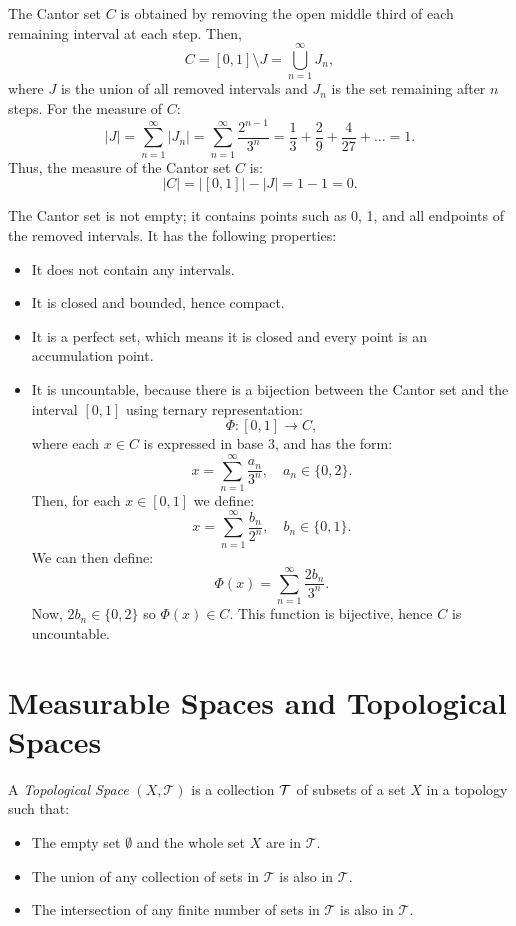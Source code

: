 \documentclass[11pt]{article}
\newcommand{\card}[1]{\lvert #1 \rvert}
\begin{document}
The Cantor set \(C\) is obtained by removing the open middle third of each remaining interval at each step. Then,
\[C = [0, 1] \setminus J = \bigcup_{n=1}^{\infty} J_n,\]
where \(J\) is the union of all removed intervals and \(J_n\) is the set remaining after \(n\) steps. For the measure of \(C\):
\[\card{J} = \sum_{n=1}^{\infty} \card{J_n} = \sum_{n=1}^{\infty} \frac{2^{n-1}}{3^n} = \frac{1}{3} + \frac{2}{9} + \frac{4}{27} + \ldots = 1.\]
Thus, the measure of the Cantor set \(C\) is:
\[\card{C} = \card{[0, 1]} - \card{J} = 1 - 1 = 0.\]

The Cantor set is not empty; it contains points such as 0, 1, and all endpoints of the removed intervals. It has the following properties:
\begin{itemize}
    \item It does not contain any intervals.
    \item It is closed and bounded, hence compact.
    \item It is a perfect set, which means it is closed and every point is an accumulation point.
    \item It is uncountable, because there is a bijection between the Cantor set and the interval \([0, 1]\) using ternary representation:
        \[\Phi: [0, 1] \to C,\]
    where each \(x \in C\) is expressed in base 3, and has the form:
        \[x = \sum_{n=1}^{\infty} \frac{a_n}{3^n}, \quad a_n \in \{0, 2\}.\]
        Then, for each \(x \in [0, 1]\) we define:
        \[x = \sum_{n=1}^{\infty} \frac{b_n}{2^n}, \quad b_n \in \{0, 1\}.\]
        We can then define:
        \[\Phi(x) = \sum_{n=1}^{\infty} \frac{2b_n}{3^n}.\]
        Now, \(2b_n \in \{0, 2\}\) so \(\Phi(x) \in C\). This function is bijective, hence \(C\) is uncountable.
\end{itemize}

\section{Measurable Spaces and Topological Spaces}
A \textit{Topological Space} $(X, \mathcal{T})$ is a collection $\cal{T}$ of subsets of a set $X$ in a topology such that:

\begin{itemize}
    \item The empty set $\emptyset$ and the whole set $X$ are in $\mathcal{T}$.
    \item The union of any collection of sets in $\mathcal{T}$ is also in $\mathcal{T}$.
    \item The intersection of any finite number of sets in $\mathcal{T}$ is also in $\mathcal{T}$.
\end{itemize}
\end{document}
